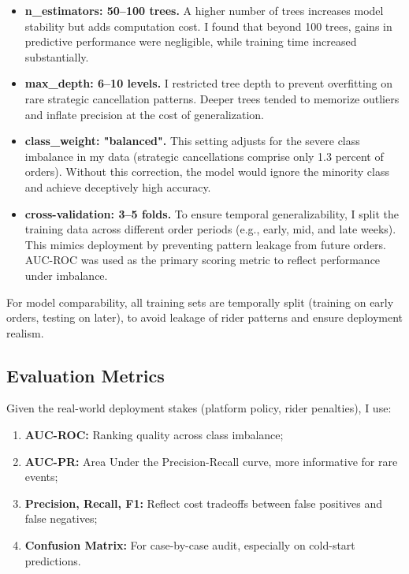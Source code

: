 \documentclass[12pt,letterpaper]{article}
\begin{document}
\begin{itemize}
    \item \textbf{n\_estimators: 50--100 trees.}  
    A higher number of trees increases model stability but adds computation cost. I found that beyond 100 trees, gains in predictive performance were negligible, while training time increased substantially.

    \item \textbf{max\_depth: 6--10 levels.}  
    I restricted tree depth to prevent overfitting on rare strategic cancellation patterns. Deeper trees tended to memorize outliers and inflate precision at the cost of generalization.

    \item \textbf{class\_weight: "balanced".}  
    This setting adjusts for the severe class imbalance in my data (strategic cancellations comprise only 1.3 percent of orders). Without this correction, the model would ignore the minority class and achieve deceptively high accuracy.

    \item \textbf{cross-validation: 3--5 folds.}  
    To ensure temporal generalizability, I split the training data across different order periods (e.g., early, mid, and late weeks). This mimics deployment by preventing pattern leakage from future orders. AUC-ROC was used as the primary scoring metric to reflect performance under imbalance.
\end{itemize}

For model comparability, all training sets are temporally split (training on early orders, testing on later), to avoid leakage of rider patterns and ensure deployment realism.

\subsection{Evaluation Metrics}

Given the real-world deployment stakes (platform policy, rider penalties), I use:

\begin{enumerate}
    \item \textbf{AUC-ROC:} Ranking quality across class imbalance;
    \item \textbf{AUC-PR:} Area Under the Precision-Recall curve, more informative for rare events;
    \item \textbf{Precision, Recall, F1:} Reflect cost tradeoffs between false positives and false negatives;
    \item \textbf{Confusion Matrix:} For case-by-case audit, especially on cold-start predictions.
\end{enumerate}
\end{document}
